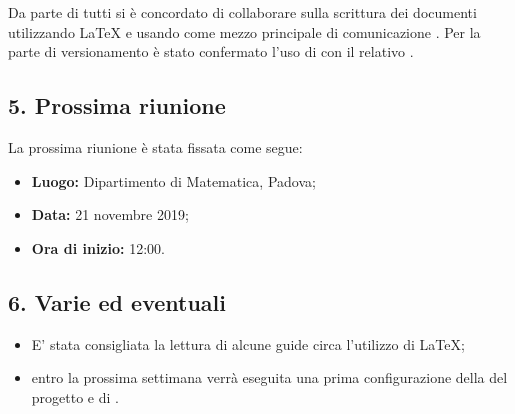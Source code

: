 Da parte di tutti si è concordato di collaborare sulla scrittura dei documenti utilizzando \LaTeX{} e usando come mezzo principale di comunicazione . Per la parte di versionamento è stato confermato l'uso di  con il relativo .

\subsection*{5. Prossima riunione}

La prossima riunione è stata fissata come segue:
\begin{itemize}
	\item \textbf{Luogo:} Dipartimento di Matematica, Padova;
	\item \textbf{Data:} 21 novembre 2019;
	\item \textbf{Ora di inizio:} 12:00.
\end{itemize}


\subsection*{6. Varie ed eventuali}

\begin{itemize}
	\item E' stata consigliata la lettura di alcune guide circa l'utilizzo di \LaTeX{};
	\item entro la prossima settimana verrà eseguita una prima configurazione della  del progetto e di .
\end{itemize}

